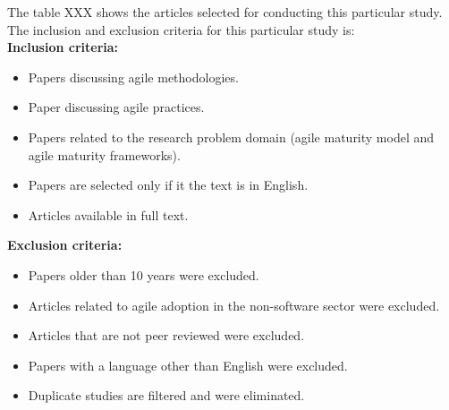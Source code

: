 \documentclass[a4paper,oneside]{bth}
\begin{document}
The table XXX shows the articles selected for conducting this particular study. The inclusion and exclusion criteria for this particular study is:\\
\textbf{Inclusion criteria:}
\begin{itemize}
\item	Papers discussing agile methodologies.
\item	Paper discussing agile practices.
\item	Papers related to the research problem domain (agile maturity model and agile maturity frameworks).
\item	Papers are selected only if it the text is in English.
\item	Articles available in full text.
\end{itemize}

\textbf{Exclusion criteria:}
\begin{itemize}
\item 	Papers older than 10 years  were excluded.
\item	Articles related to agile adoption in the non-software sector were excluded.
\item	Articles that are not peer reviewed were excluded.
\item Papers with a language other than English were excluded.
\item Duplicate studies are filtered and were eliminated.
\end{itemize}
\end{document}
